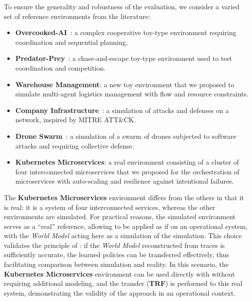 To ensure the generality and robustness of the evaluation, we consider a varied set of reference environments from the  literature:
\begin{itemize}
\item \textbf{Overcooked-AI}~\cite{overcookedai}: a complex cooperative toy-type environment requiring coordination and sequential planning.
\item \textbf{Predator-Prey}~\cite{lowe2017multi}: a chase-and-escape toy-type environment used to test coordination and competition.
\item \textbf{Warehouse Management}: a new toy environment that we proposed to simulate multi-agent logistics management with flow and resource constraints.
\item \textbf{Company Infrastructure}~\cite{cyberbattlesim}: a simulation of attacks and defenses on a network, inspired by MITRE ATT&CK.
\item \textbf{Drone Swarm}~\cite{cage_challenge_3_announcement}: a simulation of a swarm of drones subjected to software attacks and requiring collective defense.
\item \textbf{Kubernetes Microservices}: a real environment consisting of a cluster of four interconnected microservices that we proposed for the orchestration of microservices with auto-scaling and resilience against intentional failures.
\end {itemize}

The \textbf{Kubernetes Microservices} environment differs from the others in that it is real: it is a system of four interconnected services, whereas the other environments are simulated. For practical reasons, the simulated environment serves as a “real” reference, allowing  to be applied as if on an operational system, with the \textit {World Model} acting here as a simulation of the simulation. This choice validates the principle of : if the \textit{World Model} reconstructed from traces is sufficiently accurate, the learned policies can be transferred effectively, thus facilitating comparison between simulation and reality. In this scenario, the \textbf{Kubernetes Microservices} environment can be used directly with  without requiring additional modeling, and the transfer (\textbf{TRF}) is performed to this real system, demonstrating the validity of the approach in an operational context.

\medskip

